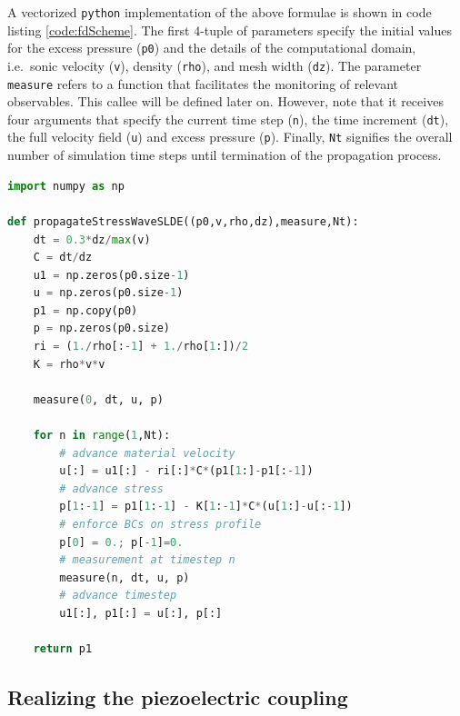 \documentclass[5p,times,twocolumn]{elsarticle}
\begin{document}
A vectorized {\tt python} implementation of the above formulae is shown 
in code listing \ref{code:fdScheme}.
The first $4$-tuple of parameters specify the initial values for the excess
pressure ({\tt{p0}}) and the details of the computational domain, i.e.\ sonic
velocity ({\tt{v}}), density ({\tt{rho}}), and mesh width ({\tt{dz}}). The
parameter {\tt measure} refers to a function that facilitates the monitoring of
relevant observables.  This callee will be defined later on.  However, note
that it receives four arguments that specify the current time step ({\tt{n}}),
the time increment ({\tt{dt}}), the full velocity field ({\tt{u}}) and excess
pressure ({\tt{p}}).  Finally, {\tt{Nt}} signifies the overall number of
simulation time steps until termination of the propagation process.

\begin{lstlisting}[float,captionpos=b,keywordstyle=\bf, frame=lines, language=Python,basicstyle=\ttfamily\scriptsize, 
caption={Implementation of
the staggered leapfrog finite difference equations for propagating the velocity
and excess pressure fields, contained in {\tt{python}} module file
{\tt{stressWavePropagation1DSLDE.py}}.}, label=code:fdScheme]
import numpy as np

def propagateStressWaveSLDE((p0,v,rho,dz),measure,Nt):
    dt = 0.3*dz/max(v)
    C = dt/dz
    u1 = np.zeros(p0.size-1)
    u = np.zeros(p0.size-1)
    p1 = np.copy(p0)
    p = np.zeros(p0.size)
    ri = (1./rho[:-1] + 1./rho[1:])/2 
    K = rho*v*v

    measure(0, dt, u, p)

    for n in range(1,Nt): 
        # advance material velocity
        u[:] = u1[:] - ri[:]*C*(p1[1:]-p1[:-1])
        # advance stress
        p[1:-1] = p1[1:-1] - K[1:-1]*C*(u[1:]-u[:-1]) 
        # enforce BCs on stress profile
        p[0] = 0.; p[-1]=0.
        # measurement at timestep n
        measure(n, dt, u, p)
        # advance timestep
        u1[:], p1[:] = u[:], p[:] 

    return p1
\end{lstlisting}


\subsection{Realizing the piezoelectric coupling}
\label{ssect:elmech}
\end{document}
